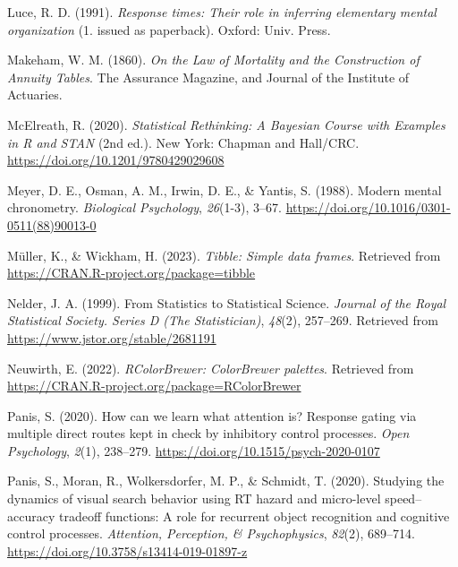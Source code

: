 \documentclass[
  man, donotrepeattitle,floatsintext]{apa6}
\newlength{\cslhangindent}
\newenvironment{CSLReferences}[2] %
 {\begin{list}{}{%
  \setlength{\itemindent}{0pt}
  \setlength{\leftmargin}{0pt}
  \setlength{\parsep}{0pt}
  \ifodd #1
   \setlength{\leftmargin}{\cslhangindent}
   \setlength{\itemindent}{-1\cslhangindent}
  \fi
  \setlength{\itemsep}{#2\baselineskip}}}
 {\end{list}}
\begin{document}
\begin{CSLReferences}{1}{0}
Luce, R. D. (1991). \emph{Response times: Their role in inferring elementary mental organization} (1. issued as paperback). Oxford: Univ. Press.

Makeham, W. M. (1860). \emph{On the {Law} of {Mortality} and the {Construction} of {Annuity Tables}}. {The Assurance Magazine, and Journal of the Institute of Actuaries}.

McElreath, R. (2020). \emph{Statistical {Rethinking}: {A Bayesian Course} with {Examples} in {R} and {STAN}} (2nd ed.). New York: {Chapman and Hall/CRC}. \url{https://doi.org/10.1201/9780429029608}

Meyer, D. E., Osman, A. M., Irwin, D. E., \& Yantis, S. (1988). Modern mental chronometry. \emph{Biological Psychology}, \emph{26}(1-3), 3--67. \url{https://doi.org/10.1016/0301-0511(88)90013-0}

Müller, K., \& Wickham, H. (2023). \emph{Tibble: Simple data frames}. Retrieved from \url{https://CRAN.R-project.org/package=tibble}

Nelder, J. A. (1999). From {Statistics} to {Statistical Science}. \emph{Journal of the Royal Statistical Society. Series D (The Statistician)}, \emph{48}(2), 257--269. Retrieved from \url{https://www.jstor.org/stable/2681191}

Neuwirth, E. (2022). \emph{RColorBrewer: ColorBrewer palettes}. Retrieved from \url{https://CRAN.R-project.org/package=RColorBrewer}

Panis, S. (2020). How can we learn what attention is? {Response} gating via multiple direct routes kept in check by inhibitory control processes. \emph{Open Psychology}, \emph{2}(1), 238--279. \url{https://doi.org/10.1515/psych-2020-0107}

Panis, S., Moran, R., Wolkersdorfer, M. P., \& Schmidt, T. (2020). Studying the dynamics of visual search behavior using {RT} hazard and micro-level speed--accuracy tradeoff functions: {A} role for recurrent object recognition and cognitive control processes. \emph{Attention, Perception, \& Psychophysics}, \emph{82}(2), 689--714. \url{https://doi.org/10.3758/s13414-019-01897-z}


\end{CSLReferences}
\end{document}
